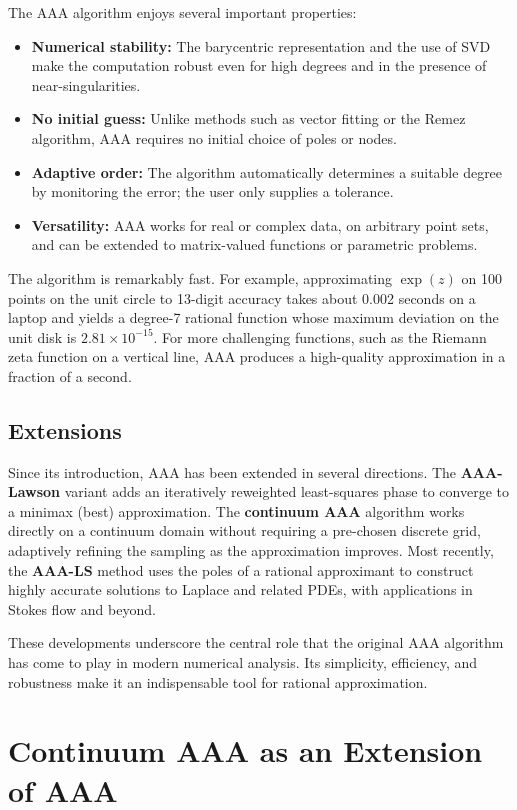 \documentclass{article}
\begin{document}
The AAA algorithm enjoys several important properties:
\begin{itemize}
\item \textbf{Numerical stability:} The barycentric representation and the use of SVD make the computation robust even for high degrees and in the presence of near-singularities.
\item \textbf{No initial guess:} Unlike methods such as vector fitting or the Remez algorithm, AAA requires no initial choice of poles or nodes.
\item \textbf{Adaptive order:} The algorithm automatically determines a suitable degree by monitoring the error; the user only supplies a tolerance.
\item \textbf{Versatility:} AAA works for real or complex data, on arbitrary point sets, and can be extended to matrix-valued functions or parametric problems.
\end{itemize}

The algorithm is remarkably fast. For example, approximating \(\exp(z)\) on 100 points on the unit circle to 13-digit accuracy takes about 0.002 seconds on a laptop and yields a degree-7 rational function whose maximum deviation on the unit disk is \(2.81\times10^{-15}\). For more challenging functions, such as the Riemann zeta function on a vertical line, AAA produces a high-quality approximation in a fraction of a second.

\subsection{Extensions}

Since its introduction, AAA has been extended in several directions. The \textbf{AAA-Lawson} variant adds an iteratively reweighted least-squares phase to converge to a minimax (best) approximation. The \textbf{continuum AAA} algorithm works directly on a continuum domain without requiring a pre-chosen discrete grid, adaptively refining the sampling as the approximation improves. Most recently, the \textbf{AAA-LS} method uses the poles of a rational approximant to construct highly accurate solutions to Laplace and related PDEs, with applications in Stokes flow and beyond.

These developments underscore the central role that the original AAA algorithm has come to play in modern numerical analysis. Its simplicity, efficiency, and robustness make it an indispensable tool for rational approximation.

\section{Continuum AAA as an Extension of AAA}
\end{document}
